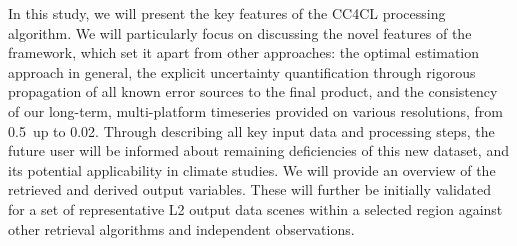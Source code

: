 In this study, we will present the key features of the CC4CL processing algorithm. We will particularly focus on discussing the novel features of the framework, which set it apart from other approaches: the optimal estimation approach in general, the explicit uncertainty quantification through rigorous propagation of all known error sources to the final product, and the consistency of our long-term, multi-platform timeseries provided on various resolutions, from 0.5\textdegree\ up to 0.02\textdegree. Through describing all key input data and processing steps, the future user will be informed about remaining deficiencies of this new dataset, and its potential applicability in climate studies. We will provide an overview of the retrieved and derived output variables. These will further be initially validated for a set of representative L2 output data scenes within a selected region against other retrieval algorithms and independent observations. 





